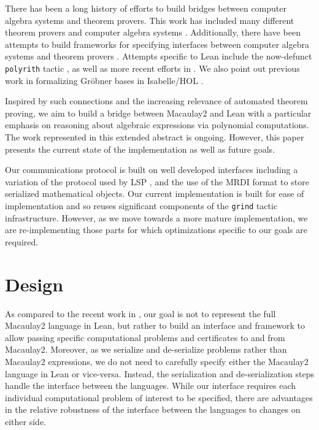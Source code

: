 \documentclass[runningheads]{llncs}
\begin{document}
There has been a long history of efforts to build bridges between computer algebra systems and theorem provers. This work has included many different theorem provers and computer algebra systems \cite{harrison-thery,DelahayeMayero2006}. Additionally, there have been attempts to build frameworks for specifying interfaces between computer algebra systems and theorem provers \cite{BertoliP.G.2006Saio}. Attempts specific to Lean include the now-defunct \texttt{polyrith} tactic \cite{polyrith}, as well as more recent efforts in \cite{DSLean}. We also point out previous work in formalizing Gr\"{o}bner bases in Isabelle/HOL \cite{MaletzkyImmler2018}.

Inspired by such connections and the increasing relevance of automated theorem proving, we aim to build a bridge between Macaulay2 \cite{M2} and Lean \cite{lean} with a particular emphasis on reasoning about algebraic expressions via polynomial computations. The work represented in this extended abstract is ongoing.  However, this paper presents the current state of the implementation as well as future goals.

Our communications protocol is built on well developed interfaces including a variation of the protocol used by LSP \cite{lsp}, and the use of the MRDI format \cite{mrdi} to store serialized mathematical objects. Our current implementation is built for ease of implementation and so reuses significant components of the \texttt{grind} tactic infrastructure. However, as we move towards a more mature implementation, we are re-implementing those parts for which optimizations specific to our goals are required.

\section{Design}
\label{sec:design}

As compared to the recent work in \cite{DSLean}, our goal is not to represent the full Macaulay2 language in Lean, but rather to build an interface and framework to allow passing specific computational problems and certificates to and from Macaulay2. Moreover, as we serialize and de-serialize problems rather than Macaulay2 expressions, we do not need to carefully specify either the Macaulay2 language in Lean or vice-versa. Instead, the serialization and de-serialization steps handle the interface between the languages. While our interface requires each individual computational problem of interest to be specified, there are advantages in the relative robustness of the interface between the languages to changes on either side.
\end{document}
